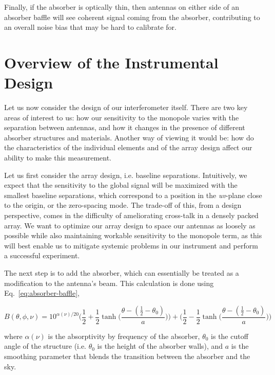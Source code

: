 Finally, if the absorber is optically thin, then antennas on either side of an 
absorber baffle will see coherent signal coming from the absorber, contributing 
to an overall noise bias that may be hard to calibrate for.

\section{Overview of the Instrumental Design}

Let us now consider the design of our interferometer itself. There are two key 
areas of interest to us: how our sensitivity to the monopole varies with the 
separation between antennas, and how it changes in the presence of different 
absorber structures and materials. Another way of viewing it would be: how do 
the characteristics of the individual elements and of the array design affect 
our ability to make this measurement.

Let us first consider the array design, i.e. baseline separations. Intuitively, 
we expect that the sensitivity to the global signal will be maximized with the 
smallest baseline separations, which correspond to a position in the 
\emph{uv}-plane close to the origin, or the zero-spacing mode.  The trade-off 
of this, from a design perspective, comes in the difficulty of ameliorating 
cross-talk in a densely packed array. We want to optimize our array design to 
space our antennas as loosely as possible while also maintaining workable 
sensitivity to the monopole term, as this will best enable us to mitigate 
systemic problems in our instrument and perform a successful experiment.

The next step is to add the absorber, which can essentially be treated as a 
modification to the antenna's beam. This calculation is done using 
Eq.~\eqref{eq:absorber-baffle},

\begin{equation}
    \label{eq:absorber-baffle}
    B(\theta, \phi, \nu) = 10^{\alpha(\nu)/20} \Big(\frac{1}{2} + \frac{1}{2} 
    \tanh\Big(\frac{\theta - (\frac{1}{2} - \theta_{0})}{a}\Big)\Big) +
    \Big(\frac{1}{2} - \frac{1}{2} \tanh\Big(\frac{\theta - (\frac{1}{2} - 
    \theta_{0})}{a}\Big)\Big)
\end{equation}

where $\alpha(\nu)$ is the absorptivity by frequency of the absorber, 
$\theta_0$ is the cutoff angle of the structure (i.e. $\theta_0$ is the height 
of the absorber walls), and $a$ is the smoothing parameter that blends the 
transition between the absorber and the sky.

